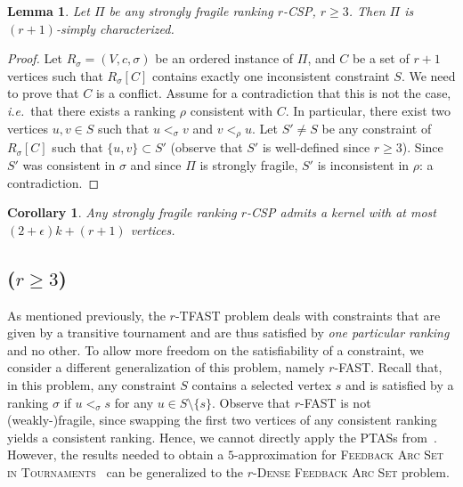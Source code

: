 \documentclass[11pt]{article}
\newtheorem{corollary}[theorem]{Corollary}
\newtheorem{lemma}[theorem]{Lemma}
\def\ie{{\em i.e.}~}
\newcommand{\FASHT}{\textsc{$r$-Dense Feedback Arc Set}}
\begin{document}
\begin{lemma}
\label{lem:lcrfast}
	Let $\Pi$ be any strongly fragile ranking $r$-CSP, $r \geqslant 3$. Then $\Pi$ is $(r+1)$-simply  
	characterized. 
\end{lemma}

\begin{proof}
	Let $R_\sigma = (V, c, \sigma)$ be an ordered instance of $\Pi$, and $C$ be a 
	set of $r + 1$ vertices such that $R_\sigma[C]$ contains exactly one inconsistent constraint $S$. We need to prove that $C$ is a conflict. Assume for a contradiction 
	that this is not the case, \ie that there exists a ranking $\rho$ consistent 
	with $C$. In particular, there exist two vertices $u,v \in S$ such that 
	$u <_\sigma v$ and $v <_\rho u$. Let $S' \neq S$ be any constraint of $R_\sigma[C]$ 
	such that $\{u,v\} 
	\subset S'$ (observe that $S'$ is well-defined since $r \geqslant 3$). 
	Since $S'$ was consistent in $\sigma$ and since $\Pi$ 
	is strongly fragile, $S'$ is inconsistent in $\rho$: a contradiction.
 \end{proof}

\begin{corollary}
	Any strongly fragile ranking $r$-CSP admits a kernel with at most $(2 + \epsilon)k + (r + 1)$  
	vertices. 
\end{corollary}

\subsection{ ($r \geqslant 3$)}
\label{subsec:rfasht}

As mentioned previously, the {\sc $r$-TFAST}  problem deals with constraints that are given by a transitive tournament and are thus satisfied by \emph{one particular ranking} and no other. To allow more freedom on the satisfiability of a constraint, we consider a different generalization of this problem, namely {\sc $r$-FAST}. Recall that, in this problem, any constraint $S$ contains a selected vertex $s$ and is satisfied by a ranking $\sigma$ if $u <_\sigma s$ for any $u \in S \setminus \{s\}$. Observe that {\sc $r$-FAST} is not (weakly-)fragile, since swapping the first two vertices of any consistent ranking yields a consistent ranking. Hence, we cannot directly apply the PTASs from~\cite{KS11}. 
\noindent However, the results needed to obtain a $5$-approximation for \textsc{Feedback Arc Set in Tournaments}~\cite{CFR06} can be generalized to the \FASHT{} problem.
\end{document}
